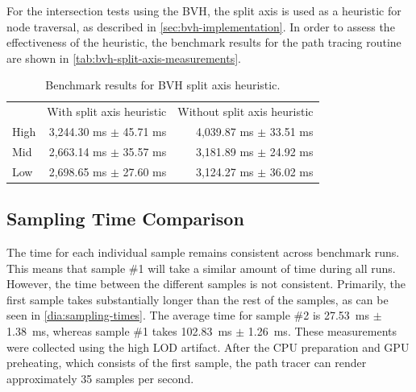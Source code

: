 For the intersection tests using the \gls{BVH}, the split axis is used as a heuristic for node traversal, as described in \autoref{sec:bvh-implementation}. In order to assess the effectiveness of the heuristic, the benchmark results for the path tracing routine are shown in \autoref{tab:bvh-split-axis-measurements}.

\begin{table}[H]
    \centering
    \begin{tabular}{@{}lrr@{}}
        \toprule
             & With split axis heuristic  & Without split axis heuristic \\
        High & 3,244.30 ms $\pm$ 45.71 ms & 4,039.87 ms $\pm$ 33.51 ms   \\
        Mid  & 2,663.14 ms $\pm$ 35.57 ms & 3,181.89 ms $\pm$ 24.92 ms   \\
        Low  & 2,698.65 ms $\pm$ 27.60 ms & 3,124.27 ms $\pm$ 36.02 ms   \\
        \bottomrule
    \end{tabular}
    \caption{Benchmark results for \gls{BVH} split axis heuristic.}
    \label{tab:bvh-split-axis-measurements}
\end{table}

\subsection*{Sampling Time Comparison}

The time for each individual sample remains consistent across benchmark runs. This means that sample \#1 will take a similar amount of time during all runs. However, the time between the different samples is not consistent. Primarily, the first sample takes substantially longer than the rest of the samples, as can be seen in \autoref{dia:sampling-times}. The average time for sample \#2 is 27.53~ms $\pm$ 1.38~ms, whereas sample \#1 takes 102.83~ms $\pm$ 1.26~ms. These measurements were collected using the high \gls{LOD} artifact. After the \gls{CPU} preparation and \gls{GPU} preheating, which consists of the first sample, the path tracer can render approximately 35 samples per second.

